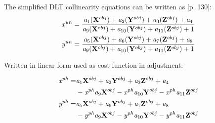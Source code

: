 \documentclass[a4paper,12pt]{article}
\newcommand{\evect}[1]{
{\bf #1}
}
\newcommand{\escal}[1]{
{\it #1}
}
\begin{document}
The simplified DLT collinearity equations can be written as \cite{pavelka2004foto10}[p. 130]:  
\begin{equation}
\begin{split}
&\escal{x}^{un} = \frac{\escal{a}_{1}(\evect{X}^{obj}) + 
                                  \escal{a}_{2}(\evect{Y}^{obj}) + 
                                  \escal{a}_{3}(\evect{Z}^{obj}) +
                                  \escal{a}_{4}
                                  }{
				  \escal{a}_{9}(\evect{X}^{obj}) + 
                                  \escal{a}_{10}(\evect{Y}^{obj}) + 
                                  \escal{a}_{11}(\evect{Z}^{obj}) +
                                   1  
                                  } \\
&\escal{y}^{un} = \frac{\escal{a}_{5}(\evect{X}^{obj}) + 
                                  \escal{a}_{6}(\evect{Y}^{obj}) + 
                                  \escal{a}_{7}(\evect{Z}^{obj}) +                                 
                                  \escal{a}_{8}
                                  }{
				  \escal{a}_{9}(\evect{X}^{obj}) + 
                                  \escal{a}_{10}(\evect{Y}^{obj}) + 
                                  \escal{a}_{11}(\evect{Z}^{obj}) +    
                                  1
                                  }
\end{split}
\end{equation}
 
Written in linear form used as cost function in adjustment:

\begin{equation}
\begin{split}
\escal{x}^{ph} =& \escal{a}_{1}\evect{X}^{obj} + 
                                  \escal{a}_{2}\evect{Y}^{obj} + 
                                  \escal{a}_{3}\evect{Z}^{obj} +
                                  \escal{a}_{4} \\
				  &- \escal{x}^{ph} \escal{a}_{9}\evect{X}^{obj} -
                                  \escal{x}^{ph} \escal{a}_{10}\evect{Y}^{obj} - 
                                  \escal{x}^{ph} \escal{a}_{11}\evect{Z}^{obj} \\
\escal{y}^{ph} =& \escal{a}_{5}\evect{X}^{obj} + 
                                  \escal{a}_{6}\evect{Y}^{obj} + 
                                  \escal{a}_{7}\evect{Z}^{obj} +                                 
                                  \escal{a}_{8}\\
				  &- \escal{y}^{ph} \escal{a}_{9}\evect{X}^{obj} -
                                  \escal{y}^{ph} \escal{a}_{10}\evect{Y}^{obj} - 
                                  \escal{y}^{ph} \escal{a}_{11}\evect{Z}^{obj}    
\end{split}
\end{equation}
 
\end{document}
